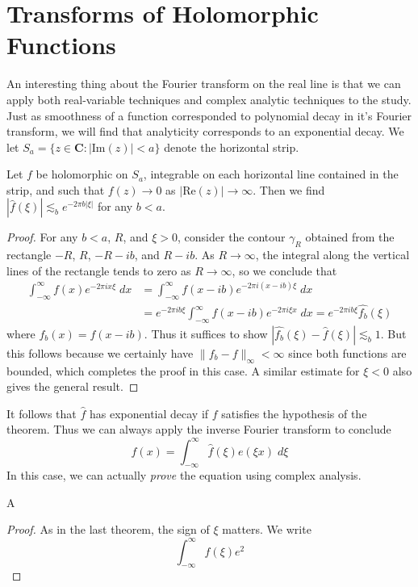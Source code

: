 \section{Transforms of Holomorphic Functions}

An interesting thing about the Fourier transform on the real line is that we can apply both real-variable techniques and complex analytic techniques to the study. Just as smoothness of a function corresponded to polynomial decay in it's Fourier transform, we will find that analyticity corresponds to an exponential decay. We let $S_a = \{ z \in \mathbf{C}: |\text{Im}(z)| < a \}$ denote the horizontal strip.

\begin{theorem}
	Let $f$ be holomorphic on $S_a$, integrable on each horizontal line contained in the strip, and such that $f(z) \to 0$ as $|\text{Re}(z)| \to \infty$. Then we find $|\widehat{f}(\xi)| \lesssim_b e^{-2\pi b |\xi|}$ for any $b < a$.
\end{theorem}
\begin{proof}
	For any $b < a$, $R$, and $\xi > 0$, consider the contour $\gamma_R$ obtained from the rectangle $-R$, $R$, $-R-ib$, and $R-ib$. As $R \to \infty$, the integral along the vertical lines of the rectangle tends to zero as $R \to \infty$, so we conclude that
	\begin{align*}
		\int_{-\infty}^\infty f(x)e^{-2\pi i x \xi}\; dx &= \int_{-\infty}^\infty f(x-ib)e^{- 2 \pi i (x - ib) \xi}\; dx\\
		&= e^{-2 \pi i b \xi} \int_{-\infty}^\infty f(x-ib) e^{- 2 \pi i \xi x}\; dx = e^{-2 \pi i b \xi} \widehat{f_b}(\xi)
	\end{align*}
	where $f_b(x) = f(x - ib)$. Thus it suffices to show $|\widehat{f_b}(\xi) - \widehat{f}(\xi)| \lesssim_b 1$. But this follows because we certainly have $\| f_b - f \|_\infty < \infty$ since both functions are bounded, which completes the proof in this case. A similar estimate for $\xi < 0$ also gives the general result.
\end{proof}

It follows that $\widehat{f}$ has exponential decay if $f$ satisfies the hypothesis of the theorem. Thus we can always apply the inverse Fourier transform to conclude
%
\[ f(x) = \int_{-\infty}^\infty \widehat{f}(\xi) e(\xi x)\; d\xi \]
%
In this case, we can actually {\it prove} the equation using complex analysis. 

\begin{theorem}
	A
\end{theorem}
\begin{proof}
	As in the last theorem, the sign of $\xi$ matters. We write
	\[ \int_{-\infty}^\infty \widehat{f}(\xi) e^{2} \]
\end{proof}

